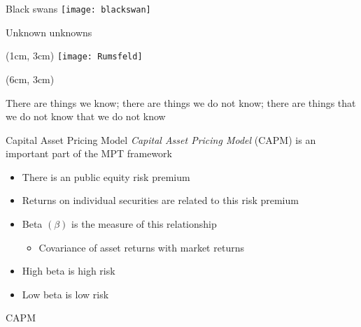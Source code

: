\documentclass[14pt,xcolor=pdftex,dvipsnames,table]{beamer}\usepackage[]{graphicx}\usepackage[]{color}
\begin{document}
\begin{frame}{Black swans}
\centering
\texttt{[image: blackswan]}
\end{frame}

\begin{frame}{Unknown unknowns}
\begin{textblock*}{5.2cm}(1cm, 3cm) %
\texttt{[image: Rumsfeld]}
\end{textblock*}
\begin{textblock*}{5.2cm}(6cm, 3cm)
\begin{block}{}
There are things we know; there are things we do not know; there are things that we do not know that we do not know
\end{block}
\end{textblock*}
\end{frame}

\begin{frame}{Capital Asset Pricing Model}
\emph{Capital Asset Pricing Model} (CAPM) is an important part of the MPT framework 
\pause
\begin{itemize}[<+-| alert@+>]
\item There is an public equity risk premium
\item Returns on individual securities are related to this risk premium
\item Beta $(\beta)$ is the measure of this relationship
\begin{itemize}
\item Covariance of asset returns with market returns
\end{itemize}
\item High beta is high risk 
\item Low beta is low risk
\end{itemize}
\end{frame}

\begin{frame}{CAPM}
\end{frame}
\end{document}
